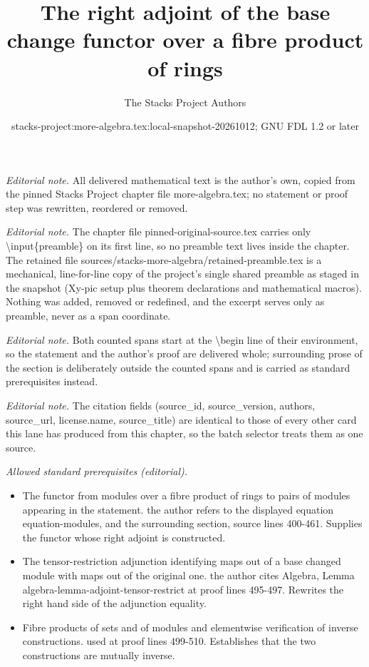 \documentclass[10pt,a4paper]{amsart}
\title{The right adjoint of the base change functor over a fibre product of rings}
\author{The Stacks Project Authors}
\date{stacks-project:more-algebra.tex:local-snapshot-20261012; GNU FDL 1.2 or later}
\theoremstyle{plain}
\theoremstyle{definition}
\theoremstyle{remark}
\numberwithin{equation}{subsection}
\begin{document}
\maketitle
\setcounter{subsection}{1}
\noindent\textit{Editorial note.} All delivered mathematical text is the author's own, copied from the pinned Stacks Project chapter file more-algebra.tex; no statement or proof step was rewritten, reordered or removed.\par\medskip
\noindent\textit{Editorial note.} The chapter file pinned-original-source.tex carries only \textbackslash{}input\{preamble\} on its first line, so no preamble text lives inside the chapter. The retained file sources/stacks-more-algebra/retained-preamble.tex is a mechanical, line-for-line copy of the project's single shared preamble as staged in the snapshot (Xy-pic setup plus theorem declarations and mathematical macros). Nothing was added, removed or redefined, and the excerpt serves only as preamble, never as a span coordinate.\par\medskip
\noindent\textit{Editorial note.} Both counted spans start at the \textbackslash{}begin line of their environment, so the statement and the author's proof are delivered whole; surrounding prose of the section is deliberately outside the counted spans and is carried as standard prerequisites instead.\par\medskip
\noindent\textit{Editorial note.} The citation fields (source\_id, source\_version, authors, source\_url, license.name, source\_title) are identical to those of every other card this lane has produced from this chapter, so the batch selector treats them as one source.\par\medskip
\noindent\textit{Allowed standard prerequisites (editorial).}\begin{itemize}
\item The functor from modules over a fibre product of rings to pairs of modules appearing in the statement. the author refers to the displayed equation equation-modules, and the surrounding section, source lines 400-461. Supplies the functor whose right adjoint is constructed.
\item The tensor-restriction adjunction identifying maps out of a base changed module with maps out of the original one. the author cites Algebra, Lemma algebra-lemma-adjoint-tensor-restrict at proof lines 495-497. Rewrites the right hand side of the adjunction equality.
\item Fibre products of sets and of modules and elementwise verification of inverse constructions. used at proof lines 499-510. Establishes that the two constructions are mutually inverse.
\end{itemize}\medskip
\end{document}
